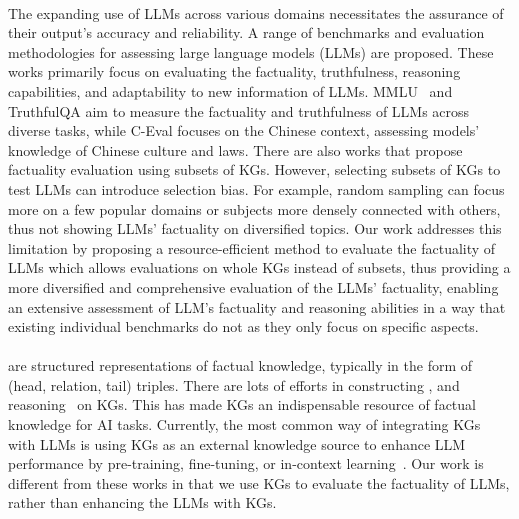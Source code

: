 \paragraph{}
The expanding use of LLMs across various domains necessitates the assurance of their output's accuracy and reliability. 
A range of benchmarks and evaluation methodologies for assessing large language models (LLMs) are proposed.
These works primarily focus on evaluating the factuality, truthfulness, reasoning capabilities, and adaptability to new information of LLMs. MMLU~\cite{MMLU} and TruthfulQA \cite{TruthfulQA} aim to measure the factuality and truthfulness of LLMs across diverse tasks, while C-Eval \cite{C-Eval} focuses on the Chinese context, assessing models' knowledge of Chinese culture and laws.
 There are also works \cite{sun2023head, liang2023holistic} that propose factuality evaluation using subsets of KGs. %
However, selecting subsets of KGs to test LLMs can introduce selection bias. For example, random sampling can focus more on a few popular domains or subjects more densely connected with others, thus not showing LLMs' factuality on diversified topics.
Our work addresses this limitation by %
proposing a resource-efficient method to evaluate the factuality of LLMs which allows evaluations on whole KGs instead of subsets, thus providing a more diversified and comprehensive evaluation of the LLMs' factuality, enabling an extensive assessment of LLM's factuality and reasoning abilities in a way that existing individual benchmarks do not as they only focus on specific aspects. 


\paragraph{}
 are structured representations of factual knowledge, typically in the form of (head, relation, tail) triples.  There are lots of efforts in constructing \cite{auer2007dbpedia}, and reasoning~\cite{bordes2013translating} on KGs. This has made KGs an indispensable resource of factual knowledge for AI tasks. 
Currently, the most common way of integrating KGs with LLMs is using KGs as an external knowledge source to enhance LLM performance by pre-training, fine-tuning, or in-context learning~\cite{yasunaga2022deep,jiang-etal-2023-reasoninglm, zhang2024knowledge,kim2023kggpt,luo2023reasoning}. Our work is different from these works in that we use KGs to evaluate the factuality of LLMs, rather than enhancing the LLMs with KGs. 


